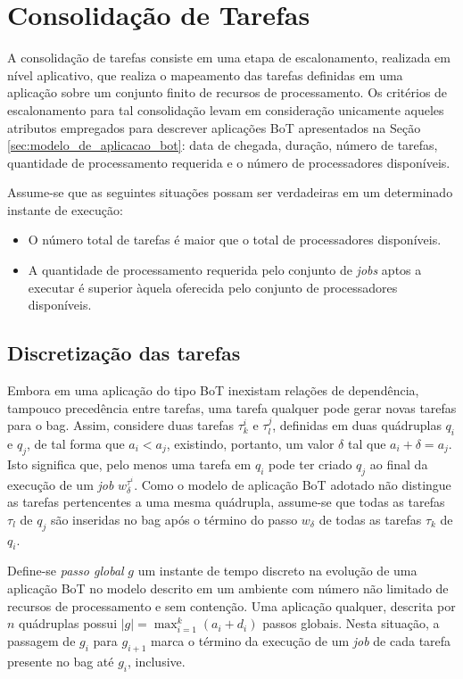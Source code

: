 \documentclass[tese,capa]{texufpel}
\begin{document}
\section{Consolidação de Tarefas}\label{sec:consolidacao_de_tarefas}

A consolidação de tarefas consiste em uma etapa de escalonamento, realizada em nível aplicativo, que realiza o mapeamento das tarefas definidas em uma aplicação sobre um conjunto finito de recursos de processamento. Os critérios de escalonamento para tal consolidação levam em consideração unicamente aqueles atributos empregados para descrever aplicações BoT apresentados na Seção \ref{sec:modelo_de_aplicacao_bot}: data de chegada, duração, número de tarefas, quantidade de processamento requerida e o número de processadores disponíveis.

Assume-se que as seguintes situações possam ser verdadeiras em um determinado instante de execução:

\begin{itemize}
\item O número total de tarefas é maior que o total de processadores disponíveis.
\item A quantidade de processamento requerida pelo conjunto de \textit{jobs} aptos a executar é superior àquela oferecida pelo conjunto de processadores disponíveis.
\end{itemize}

\subsection{Discretização das tarefas}\label{subsec:discretizacao_de_tarefas}

Embora em uma aplicação do tipo BoT inexistam relações de dependência, tampouco precedência entre tarefas, uma tarefa qualquer pode gerar novas tarefas para o bag. Assim, considere duas tarefas $\tau_k^i$ e $\tau_l^j$, definidas em duas quádruplas $q_i$ e $q_j$, de tal forma que $a_i < a_j$, existindo, portanto, um valor $\delta$ tal que $a_i+\delta=a_j$. Isto significa que, pelo menos uma tarefa em $q_i$ pode ter criado $q_j$ ao final da execução de um \textit{job} $w^{\tau^i}_\delta$. Como o modelo de aplicação BoT adotado não distingue as tarefas pertencentes a uma mesma quádrupla, assume-se que todas as tarefas $\tau_l$ de $q_j$ são inseridas no bag após o término do passo $w_{\delta}$ de todas as tarefas $\tau_k$ de $q_i$.

Define-se \emph{passo global} $g$ um instante de tempo discreto na evolução de uma aplicação BoT no modelo descrito em um ambiente com número não limitado de recursos de processamento e sem contenção. Uma aplicação qualquer, descrita por $n$ quádruplas possui $|g| = \max_{i=1}^{k}(a_i+d_i)$ passos globais. Nesta situação, a passagem de $g_i$ para $g_{i+1}$ marca o término da execução de um \textit{job} de cada tarefa presente no bag até $g_i$, inclusive.
\end{document}
